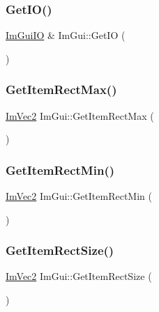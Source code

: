 \hypertarget{namespace_im_gui_a3179e560812f878f3961ce803a5d9302}{}\label{namespace_im_gui_a3179e560812f878f3961ce803a5d9302} 
\subsubsection{\texorpdfstring{Get\+I\+O()}{GetIO()}}
{\footnotesize\ttfamily \hyperlink{struct_im_gui_i_o}{Im\+Gui\+IO} \& Im\+Gui\+::\+Get\+IO (\begin{DoxyParamCaption}{ }\end{DoxyParamCaption})}

\hypertarget{namespace_im_gui_a3d260209b8dc25a2c942e8cfd1ed0e51}{}\label{namespace_im_gui_a3d260209b8dc25a2c942e8cfd1ed0e51} 
\subsubsection{\texorpdfstring{Get\+Item\+Rect\+Max()}{GetItemRectMax()}}
{\footnotesize\ttfamily \hyperlink{struct_im_vec2}{Im\+Vec2} Im\+Gui\+::\+Get\+Item\+Rect\+Max (\begin{DoxyParamCaption}{ }\end{DoxyParamCaption})}

\hypertarget{namespace_im_gui_a65b24b72ec0e8444c705cebf3e91f570}{}\label{namespace_im_gui_a65b24b72ec0e8444c705cebf3e91f570} 
\subsubsection{\texorpdfstring{Get\+Item\+Rect\+Min()}{GetItemRectMin()}}
{\footnotesize\ttfamily \hyperlink{struct_im_vec2}{Im\+Vec2} Im\+Gui\+::\+Get\+Item\+Rect\+Min (\begin{DoxyParamCaption}{ }\end{DoxyParamCaption})}

\hypertarget{namespace_im_gui_a3303d1c37041307e11fd46fc43b2274d}{}\label{namespace_im_gui_a3303d1c37041307e11fd46fc43b2274d} 
\subsubsection{\texorpdfstring{Get\+Item\+Rect\+Size()}{GetItemRectSize()}}
{\footnotesize\ttfamily \hyperlink{struct_im_vec2}{Im\+Vec2} Im\+Gui\+::\+Get\+Item\+Rect\+Size (\begin{DoxyParamCaption}{ }\end{DoxyParamCaption})}

